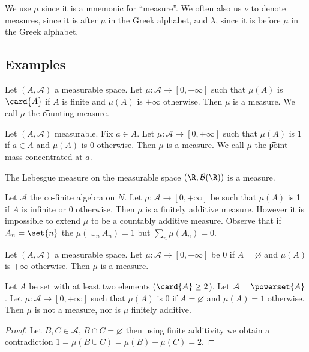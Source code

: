 We use $\mu $ since it is a mnemonic for ``measure''.
We often also us $\nu $ to denote measures, since it is after $\mu $ in the Greek alphabet, and $\lambda $, since it is before $\mu $ in the Greek alphabet.

\subsection*{Examples}

\begin{example}
Let $(A, \mathcal{A} )$ a measurable space.
Let $\mu : \mathcal{A}  \to [0, +\infty]$ such that $\mu (A)$ is $\card{A}$ if $A$ is finite and $\mu (A)$ is $+\infty$ otherwise.
Then $\mu $ is a measure.
We call $\mu $ the \t{counting measure}.
\end{example}

\begin{example}
Let $(A, \mathcal{A} )$ measurable.
Fix $a \in A$.
Let $\mu : \mathcal{A}  \to [0, +\infty]$ such that $\mu (A)$ is $1$ if $a \in A$ and $\mu (A)$ is $0$ otherwise.
Then $\mu $ is a measure.
We call $\mu $ the \t{point mass} concentrated at $a$.
\end{example}

\begin{expl}
The Lebesgue measure on the measurable space $(\R , \mathcal{B} (\R ))$ is a measure.
\end{expl}

\begin{expl}
Let $\mathcal{A} $ the co-finite algebra on $N$.
Let $\mu : \mathcal{A}  \to [0, +\infty]$ be such that $\mu (A)$ is 1 if $A$ is infinite or 0 otherwise.
Then $\mu $ is a finitely additive measure.
However it is impossible to extend $\mu $ to be a countably additive measure.
Observe that if $A_n = \set{n}$ the $\mu (\cup_{n} A_n) = 1$ but $\sum_{n} \mu (A_n) = 0$.
\end{expl}

\begin{expl}
Let $(A, \mathcal{A} )$ a measurable space.
Let $\mu : \mathcal{A}  \to [0, +\infty]$ be $0$ if $A = \varnothing$ and $\mu (A)$ is $+\infty$ otherwise.
Then $\mu $ is a measure.
\end{expl}

\begin{expl}
Let $A$ be set with at least two elements ($\card{A} \geq 2$).
Let $\mathcal{A}  = \powerset{A}$.
Let $\mu : \mathcal{A}  \to [0, +\infty]$ such that $\mu (A)$ is $0$ if $A = \varnothing$ and $\mu (A) = 1$ otherwise.
Then $\mu $ is not a measure, nor is $\mu $ finitely additive.
\begin{proof}
Let $B, C \in \mathcal{A} $,
$B \cap  C = \varnothing$
then using finite additivity
we obtain a contradiction
$
1 = μ(B \cup C) = μ(B) + μ(C) = 2
$.
\end{proof}
\end{expl}

